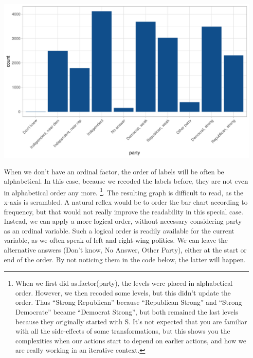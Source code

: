 \documentclass[]{tufte-book}
\newenvironment{Shaded}{}{}
\newcommand{\KeywordTok}[1]{\textcolor[rgb]{0.00,0.44,0.13}{\textbf{#1}}}
\newcommand{\DataTypeTok}[1]{\textcolor[rgb]{0.56,0.13,0.00}{#1}}
\newcommand{\DecValTok}[1]{\textcolor[rgb]{0.25,0.63,0.44}{#1}}
\newcommand{\StringTok}[1]{\textcolor[rgb]{0.25,0.44,0.63}{#1}}
\newcommand{\OperatorTok}[1]{\textcolor[rgb]{0.40,0.40,0.40}{#1}}
\newcommand{\NormalTok}[1]{#1}
\begin{document}
\begin{Shaded}
\end{Shaded}

\includegraphics{cleaning_tutorial_files/figure-latex/unnamed-chunk-27-1}

When we don't have an ordinal factor, the order of labels will be often
be alphabetical. In this case, because we recoded the labels before,
they are not even in alphabetical order any more. \footnote{When we
  first did as.factor(party), the levels were placed in alphabetical
  order. However, we then recoded some levels, but this didn't update
  the order. Thus ``Strong Republican'' because ``Republican Strong''
  and ``Strong Democrate'' became ``Democrat Strong'', but both remained
  the last levels because they originally started with S. It's not
  expected that you are familiar with all the side-effects of some
  transformations, but this shows you the complexities when our actions
  start to depend on earlier actions, and how we are really working in
  an iterative context.}. The resulting graph is difficult to read, as
the x-axis is scrambled. A natural reflex would be to order the bar
chart according to frequency, but that would not really improve the
readability in this special case. Instead, we can apply a more logical
order, without necessary considering party as an ordinal variable. Such
a logical order is readily available for the current variable, as we
often speak of left and right-wing politics. We can leave the
alternative answers (Don't know, No Answer, Other Party), either at the
start or end of the order. By not noticing them in the code below, the
latter will happen.
\end{document}
